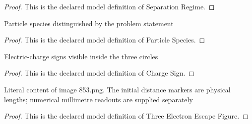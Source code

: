\begin{proof}
  This is the declared model definition of Separation Regime.
\end{proof}
\begin{definition}
  \label{def:physics:phyx-mini-0853:phyxminiproblems-problemphyxmini0853-particlespecies}
  Particle species distinguished by the problem statement
\end{definition}
\begin{proof}
  This is the declared model definition of Particle Species.
\end{proof}
\begin{definition}
  \label{def:physics:phyx-mini-0853:phyxminiproblems-problemphyxmini0853-chargesign}
  Electric-charge signs visible inside the three circles
\end{definition}
\begin{proof}
  This is the declared model definition of Charge Sign.
\end{proof}
\begin{definition}
  \label{def:physics:phyx-mini-0853:phyxminiproblems-problemphyxmini0853-threeelectronescapefigure}
  Literal content of image 853.png. The initial distance markers are physical lengths; numerical millimetre readouts are supplied separately
\end{definition}
\begin{proof}
  This is the declared model definition of Three Electron Escape Figure.
\end{proof}
